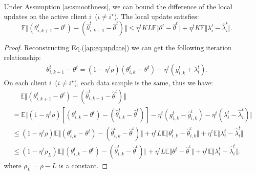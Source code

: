 \begin{lemma}
\label{ap:lemma:local updates i}
    Under Assumption \ref{as:smoothness}, we can bound the difference of the local updates on the active client $i$~($i\neq i^\star$). The local update satisfies:
    \begin{equation}
        \mathbb{E}\Vert\left(\theta_{i,k+1}^t - \theta^t \right) - \left(\hat{\theta}_{i,k+1}^t - \hat{\theta}^t \right)\Vert 
        \leq \eta^t KL\mathbb{E}\Vert \theta^t - \hat{\theta}^t\Vert + \eta^t K\mathbb{E}\Vert \lambda_i^t - \hat{\lambda}_i^t\Vert.
    \end{equation}
\end{lemma}
\begin{proof}
    Reconstructing Eq.(\ref{ap:eq:update}) we can get the following iteration relationship:
    \begin{align*}
        \theta_{i,k+1}^t - \theta^t = \left(1-\eta^t\rho\right)\left(\theta_{i,k}^t - \theta^t\right) - \eta^t \left(g_{i,k}^t + \lambda_i^t\right).
    \end{align*}
    On each client $i$~($i\neq i^\star$), each data sample is the same, thus we have:
    \begin{align*}
        &\quad \ \mathbb{E}\Vert\left(\theta_{i,k+1}^t - \theta^t \right) - \left(\hat{\theta}_{i,k+1}^t - \hat{\theta}^t \right)\Vert\\
        &= \mathbb{E}\Vert\left(1-\eta^t\rho\right)\left[\left(\theta_{i,k}^t - \theta^t \right) - \left(\hat{\theta}_{i,k}^t - \hat{\theta}^t \right)\right] - \eta^t\left(g_{i,k}^t - \hat{g}_{i,k}^t\right)- \eta^t\left(\lambda_i^t - \hat{\lambda}_i^t\right)\Vert\\
        &\leq \left(1-\eta^t\rho\right)\mathbb{E}\Vert\left(\theta_{i,k}^t - \theta^t\right) - \left(\hat{\theta}_{i,k}^t - \hat{\theta}^t \right)\Vert + \eta^t L\mathbb{E}\Vert \theta_{i,k}^t - \hat{\theta}_{i,k}^t\Vert + \eta^t\mathbb{E}\Vert \lambda_i^t - \hat{\lambda}_i^t\Vert\\
        &\leq \left(1-\eta^t\rho_L\right)\mathbb{E}\Vert\left(\theta_{i,k}^t - \theta^t \right) - \left(\hat{\theta}_{i,k}^t - \hat{\theta}^t \right)\Vert + \eta^t L\mathbb{E}\Vert \theta^t - \hat{\theta}^t\Vert + \eta^t\mathbb{E}\Vert\lambda_i^t - \hat{\lambda}_i^t\Vert.
    \end{align*}
    where $\rho_L = \rho - L$ is a constant.


\end{proof}
